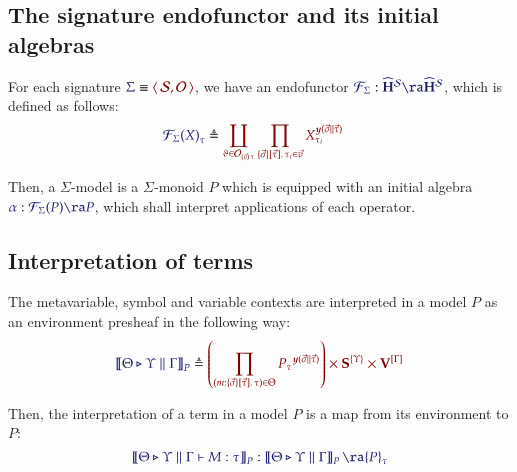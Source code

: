 \documentclass[11pt]{article}
\theoremstyle{definition}
\theoremstyle{remark}
\numberwithin{equation}{section}
\newcommand\HypCat{\mathbf{H}}
\begin{document}
\subsection{The signature endofunctor and its initial algebras}

For each signature $\Match{\Sigma}{\Pair{\Sorts}{\Operators}}$, we have an
endofunctor
$\Of{\SigFun{\Sigma}}{\widehat{\HypCat}^\Sorts\ra\widehat{\HypCat}^\Sorts}$,
which is defined as follows:
\begin{align*}
  \IMode{{\SigFun{\Sigma}(X)}_{\tau}}
&
    \triangleq
    \OMode{
      \coprod_{
        \vartheta\in \Operators_{\MkArity{\vec{v}}{\tau}}
      }
      \prod_{
        \MkValence
          {\vec{\sigma}}
          {\vec{\tau}}
          {\tau_i}
        \in\vec{v}
      }
      X_{\tau_i}^{\Yoneda{\vec{\sigma}\parallel\vec{\tau}}}
    }
\end{align*}

Then, a $\Sigma$-model is a $\Sigma$-monoid $P$ which is equipped with an
initial algebra $\Of{\alpha}{\SigFun{\Sigma}(P)\ra P}$, which shall interpret
applications of each operator.

\subsection{Interpretation of terms}

The metavariable, symbol and variable contexts are interpreted in a model $P$ as
an environment presheaf in the following way:
\[
  \Define{
    \SemBrackets{
      \Theta\triangleright\Upsilon\parallel\Gamma
    }_P
  }{
    \left(
      \prod_{
        (m:%
        \MkValence
          {\vec{\sigma}}
          {\vec{\tau}}
          {\tau})
        \in\Theta
      }{{P_{\tau}}^{\Yoneda{\vec{\sigma}\parallel\vec{\tau}}}}
    \right)
    \times
    \SymPsh^{\{\Upsilon\}}
    \times
    \VarPsh^{[\Gamma]}
  }
\]

Then, the interpretation of a term in a model $P$ is a map from its environment
to $P$:
\[
  \Of{
    \SemBrackets{
      \Theta\triangleright\Upsilon\parallel\Gamma\vdash M:\tau
    }_{P}
  }{
    \SemBrackets{
      \Theta\triangleright\Upsilon\parallel\Gamma
    }_{P}\ra {P}_{\tau}
  }
\]
\end{document}
